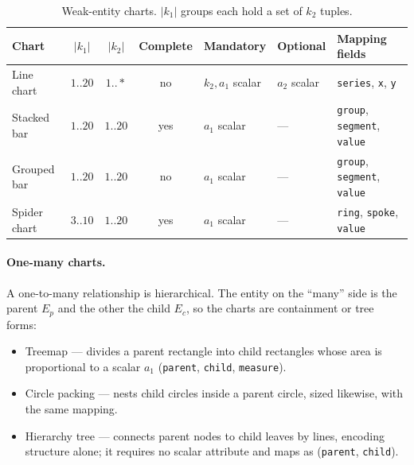 \begin{table}[htbp]
\centering
\caption{Weak-entity charts. $|k_1|$ groups each hold a set of $k_2$ tuples.}
\label{tab:step2-weak}
\small
\renewcommand{\arraystretch}{1.25}
\begin{tabular}{@{}lccclll@{}}
\toprule
\textbf{Chart} & \textbf{$|k_1|$} & \textbf{$|k_2|$} & \textbf{Complete} & \textbf{Mandatory} & \textbf{Optional} & \textbf{Mapping fields} \\
\midrule
Line chart & $1..20$ & $1..*$ & no & $k_2,a_1$ scalar & $a_2$ scalar & \texttt{series}, \texttt{x}, \texttt{y} \\
Stacked bar & $1..20$ & $1..20$ & yes & $a_1$ scalar & --- & \texttt{group}, \texttt{segment}, \texttt{value} \\
Grouped bar & $1..20$ & $1..20$ & no & $a_1$ scalar & --- & \texttt{group}, \texttt{segment}, \texttt{value} \\
Spider chart & $3..10$ & $1..20$ & yes & $a_1$ scalar & --- & \texttt{ring}, \texttt{spoke}, \texttt{value} \\
\bottomrule
\end{tabular}
\end{table}

\paragraph{One-many charts.} A one-to-many relationship is hierarchical. The entity on the ``many'' side is the parent $E_p$ and the other the child $E_c$, so the charts are containment or tree forms:
\begin{itemize}
  \item Treemap --- divides a parent rectangle into child rectangles whose area is proportional to a scalar $a_1$ (\texttt{parent}, \texttt{child}, \texttt{measure}).
  \item Circle packing --- nests child circles inside a parent circle, sized likewise, with the same mapping.
  \item Hierarchy tree --- connects parent nodes to child leaves by lines, encoding structure alone; it requires no scalar attribute and maps as (\texttt{parent}, \texttt{child}).
\end{itemize}

